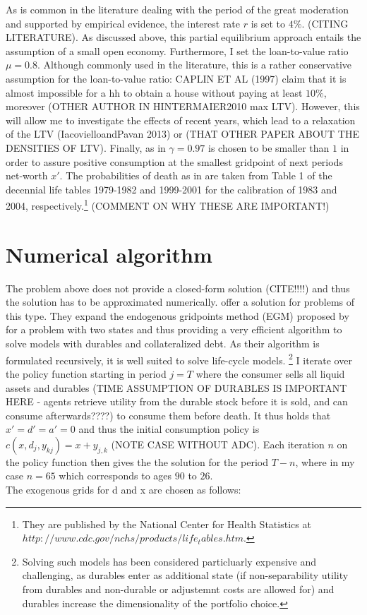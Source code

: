 \documentclass[a4paper,12pt]{article}
\begin{document}
As is common in the literature dealing with the period of the great moderation and supported by empirical evidence, the interest rate $r$ is set to $4\%$. (CITING LITERATURE). As discussed above, this partial equilibrium approach entails the assumption of a small open economy. Furthermore, I set the loan-to-value ratio $\mu = 0.8$. Although commonly used in the literature, this is a rather conservative assumption for the loan-to-value ratio: CAPLIN ET AL (1997) claim that it is almost impossible for a hh to obtain a house without paying at least $10\%$, moreover (OTHER AUTHOR IN HINTERMAIER2010 max LTV). However, this will allow me to investigate the effects of recent years, which lead to a relaxation of the LTV (IacovielloandPavan 2013) or (THAT OTHER PAPER ABOUT THE DENSITIES OF LTV). Finally, as in \cite{hintermaier2010} $\gamma = 0.97$ is chosen to be smaller than $1$ in order to assure positive consumption at the smallest gridpoint of next periods net-worth $x'$. The probabilities of death as in \cite{hintermaier2011} are taken from Table 1 of the decennial life tables 1979-1982 and 1999-2001 for the calibration of 1983 and 2004, respectively.\footnote{They are published by the National Center for Health Statistics at $http://www.cdc.gov/nchs/products/life_tables.htm$.} (COMMENT ON WHY THESE ARE IMPORTANT!)

\section{Numerical algorithm}

The problem above does not provide a closed-form solution (CITE!!!!) and thus the solution has to be approximated numerically. \cite{hintermaier2010} offer a solution for problems of this type. They expand the endogenous gridpoints method (EGM) proposed by \cite{carroll2006} for a problem with two states and thus providing a very efficient algorithm to solve models with durables and collateralized debt. As their algorithm is formulated recursively, it is well suited to solve life-cycle models. \footnote{Solving such models has been considered particluarly expensive and challenging, as durables enter as additional state (if non-separability utility from durables and non-durable or adjustemnt costs are allowed for) and durables increase the dimensionality of the portfolio choice.\citep{hintermaier2010}} I iterate over the policy function starting in period $j = T$ where the consumer sells all liquid assets and durables (TIME ASSUMPTION OF DURABLES IS IMPORTANT HERE - agents retrieve utility from the durable stock before it is sold, and can consume afterwards????) to consume them before death. It thus holds that $x'=d'=a'=0$ and thus the initial consumption policy is $c(x,d_{j},y_{kj})=x+y_{j,k}$ (NOTE CASE WITHOUT ADC). Each iteration $n$ on the policy function then gives the the solution for the period $T-n$, where in my case $n=65$ which corresponds to ages $90$ to $26$. \\
The exogenous grids for d and x are chosen as follows: 
\end{document}
